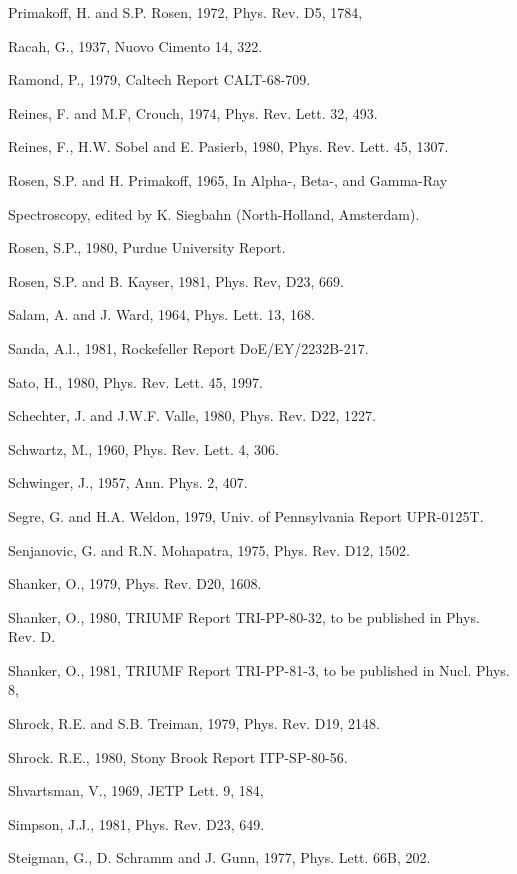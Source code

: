 \documentclass[twoside]{article}
\begin{document}
{{{{{{{{{{{{{{{{\begin{thebibliography}{10}
\bibitem{}
Primakoff, H. and S.P. Rosen, 1972, Phys. Rev. D5, 1784,


\bibitem{}
Racah, G., 1937, Nuovo Cimento 14, 322.

\bibitem{}
Ramond, P., 1979, Caltech Report CALT-68-709.

\bibitem{}
Reines, F. and M.F, Crouch, 1974, Phys. Rev. Lett. 32, 493.

\bibitem{}
Reines, F., H.W. Sobel and E. Pasierb, 1980, Phys. Rev. Lett. 45, 1307.

\bibitem{}
Rosen, S.P. and H. Primakoff, 1965, In Alpha-, Beta-, and Gamma-Ray

\bibitem{}
Spectroscopy, edited by K. Siegbahn (North-Holland, Amsterdam).

\bibitem{}
Rosen, S.P., 1980, Purdue University Report.

\bibitem{}
Rosen, S.P. and B. Kayser, 1981, Phys. Rev, D23, 669.

\bibitem{}
Salam, A. and J. Ward, 1964, Phys. Lett. 13, 168.

\bibitem{}
Sanda, A.l., 1981, Rockefeller Report DoE/EY/2232B-217.

\bibitem{}
Sato, H., 1980, Phys. Rev. Lett. 45, 1997.

\bibitem{}
Schechter, J. and J.W.F. Valle, 1980, Phys. Rev. D22, 1227.

\bibitem{}
Schwartz, M., 1960, Phys. Rev. Lett. 4, 306.

\bibitem{}
Schwinger, J., 1957, Ann. Phys. 2, 407.

\bibitem{}
Segre, G. and H.A. Weldon, 1979, Univ. of Pennsylvania Report UPR-0125T.

\bibitem{}
Senjanovic, G. and R.N. Mohapatra, 1975, Phys. Rev. D12, 1502.

\bibitem{}
Shanker, O., 1979, Phys. Rev. D20, 1608.

\bibitem{}
Shanker, O., 1980, TRIUMF Report TRI-PP-80-32, to be published in Phys. Rev. D.

\bibitem{}
Shanker, O., 1981, TRIUMF Report TRI-PP-81-3, to be published in Nucl. Phys. 8,

\bibitem{}
Shrock, R.E. and S.B. Treiman, 1979, Phys. Rev. D19, 2148.

\bibitem{}
Shrock. R.E., 1980, Stony Brook Report ITP-SP-80-56.

\bibitem{}
Shvartsman, V., 1969, JETP Lett. 9, 184,

\bibitem{}
Simpson, J.J., 1981, Phys. Rev. D23, 649.

\bibitem{}
Steigman, G., D. Schramm and J. Gunn, 1977, Phys. Lett. 66B, 202.


\end{thebibliography}}}}}}}}}}}}}}}}}
\end{document}
